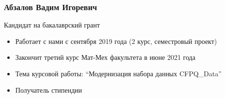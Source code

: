 \documentclass[xcolor=table,aspectratio=169]{beamer}
\begin{document}
\begin{frame}[fragile] \frametitle{Абзалов Вадим Игоревич}
      \begin{minipage}[m]{0.45\linewidth}
  \end{minipage}\hfill
  \begin{minipage}[m]{0.54\linewidth}
  \vspace{-2cm}
  Кандидат на бакалаврский грант

  \begin{itemize}
        \item Работает с нами с сентября 2019 года (2 курс, семестровый проект)
        \item Закончит третий курс Мат-Мех факультета в июне 2021 года
        \item Тема курсовой работы: ``Модернизация набора данных CFPQ\_Data''
        \item Получатель стипендии        
  \end{itemize}
  \end{minipage}

\end{frame}
\end{document}

